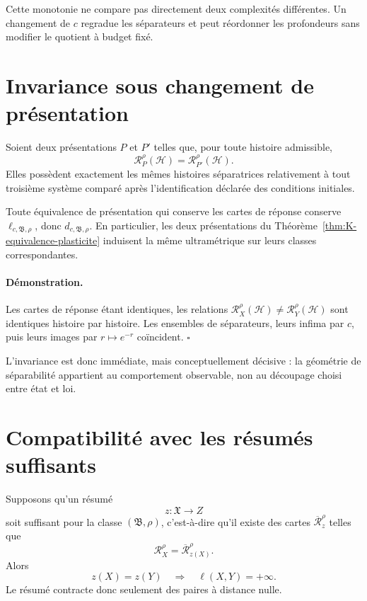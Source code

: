 Cette monotonie ne compare pas directement deux complexités différentes.
Un changement de \(c\) regradue les séparateurs et peut réordonner les
profondeurs sans modifier le quotient à budget fixé.

\section{Invariance sous changement de présentation}
\label{annexe-L-invariance}

Soient deux présentations \(P\) et \(P'\) telles que, pour toute histoire
admissible,
\[
\mathcal R_P^\rho(\mathcal H)
=
\mathcal R_{P'}^\rho(\mathcal H).
\]
Elles possèdent exactement les mêmes histoires séparatrices relativement
à tout troisième système comparé après l'identification déclarée des
conditions initiales.

\begin{encadre}[title={Corollaire \theproposition{} --- Invariance par rebaptême}]
Toute équivalence de présentation qui conserve les cartes de réponse
conserve \(\ell_{c,\mathfrak B,\rho}\), donc
\(d_{c,\mathfrak B,\rho}\). En particulier, les deux présentations du
Théorème~\ref{thm:K-equivalence-plasticite} induisent la même ultramétrique sur leurs classes
correspondantes.
\end{encadre}

\paragraph{Démonstration.}
Les cartes de réponse étant identiques, les relations
\(
\mathcal R_X^\rho(\mathcal H)\neq
\mathcal R_Y^\rho(\mathcal H)
\)
sont identiques histoire par histoire. Les ensembles de séparateurs,
leurs infima par \(c\), puis leurs images par \(r\mapsto e^{-r}\)
coïncident. \hfill\(\square\)

L'invariance est donc immédiate, mais conceptuellement décisive : la
géométrie de séparabilité appartient au comportement observable, non au
découpage choisi entre état et loi.

\section{Compatibilité avec les résumés suffisants}
\label{annexe-L-resumes}

Supposons qu'un résumé
\[
z:\mathfrak X\longrightarrow Z
\]
soit suffisant pour la classe \((\mathfrak B,\rho)\), c'est-à-dire qu'il
existe des cartes \(\overline{\mathcal R}_z^\rho\) telles que
\[
\mathcal R_X^\rho
=
\overline{\mathcal R}_{z(X)}^\rho.
\]
Alors
\[
z(X)=z(Y)
\quad\Longrightarrow\quad
\ell(X,Y)=+\infty.
\]
Le résumé contracte donc seulement des paires à distance nulle.

